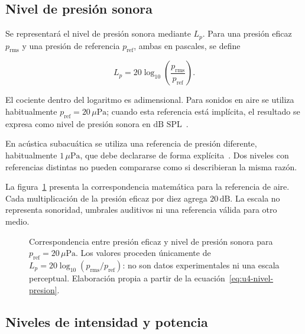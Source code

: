 \subsection{Nivel de presión sonora}
\label{sec:u4-nivel-presion}

Se representará el nivel de presión sonora mediante \(L_p\). Para una presión
eficaz \(p_\mathrm{rms}\) y una presión de referencia
\(p_\mathrm{ref}\), ambas en pascales, se define

\begin{equation}
    L_p=20\log_{10}\!\left(
        \frac{p_\mathrm{rms}}{p_\mathrm{ref}}\right).
    \label{eq:u4-nivel-presion}
\end{equation}

El cociente dentro del logaritmo es adimensional. Para sonidos en aire
se utiliza habitualmente \(p_\mathrm{ref}=20\,\mu\text{Pa}\); cuando esta
referencia está implícita, el resultado se expresa como nivel de presión
sonora en \(\text{dB SPL}\)~\cite{nistSP811,iso1683_2015}.

En acústica subacuática se utiliza una referencia de presión diferente,
habitualmente \(1\,\mu\text{Pa}\), que debe declararse de forma explícita~\cite{nistSP811,iso1683_2015}.
Dos niveles con referencias distintas no pueden compararse como si
describieran la misma razón.

La figura~\ref{fig:u4-escala-presion-db-spl} presenta la correspondencia
matemática para la referencia de aire. Cada multiplicación de la presión
eficaz por diez agrega \(20\,\text{dB}\). La escala no representa sonoridad,
umbrales auditivos ni una referencia válida para otro medio.

\begin{figure}[htbp]
    \centering
    
    \caption{Correspondencia entre presión eficaz y nivel de presión sonora
    para \(p_\mathrm{ref}=20\,\mu\text{Pa}\). Los valores proceden únicamente
    de \(L_p=20\log_{10}(p_\mathrm{rms}/p_\mathrm{ref})\): no son datos
    experimentales ni una escala perceptual. Elaboración propia a partir de la
    ecuación~\eqref{eq:u4-nivel-presion}.}
    \label{fig:u4-escala-presion-db-spl}
\end{figure}

\subsection{Niveles de intensidad y potencia}
\label{sec:u4-niveles-energia}

